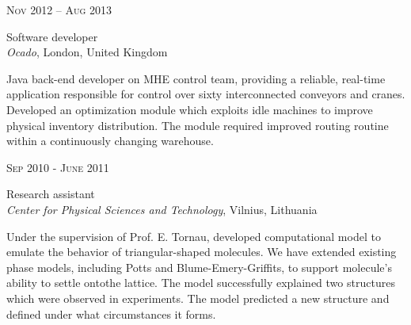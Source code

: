 \documentclass[10pt]{article} %
\begin{document}
{\begin{minipage}[t]{0.5\textwidth}

{\raggedleft\textsc{Nov 2012 – Aug 2013}\par}

{\raggedright\large Software developer\\
\textit{Ocado}, London, United Kingdom\\[5pt]}

\normalsize{Java back-end developer on MHE control team,
providing a reliable, real-time application responsible for
control over sixty interconnected conveyors and cranes.
Developed an optimization module which exploits idle machines
to improve physical inventory distribution.
The module required improved routing routine within a continuously changing warehouse.}\\


\vspace{0.5cm}
{\raggedleft\textsc{Sep 2010 - June 2011}\par}

{\raggedright\large Research assistant\\
\textit{Center for Physical Sciences and Technology}, Vilnius, Lithuania\\[5pt]}

\normalsize{Under the supervision of Prof. E. Tornau,
 developed computational model to emulate the behavior
of triangular-shaped molecules. We have extended existing
phase models, including Potts and Blume-Emery-Griffits,
to support molecule's ability to settle ontothe lattice.
The model successfully explained two structures which were observed in experiments.
The model predicted a new structure and defined under what circumstances it forms.}\\


\end{minipage} %
\hfill
\begin{minipage}[t]{0.44\textwidth} %
\vspace{0pt} %



\end{minipage}}
\end{document}
